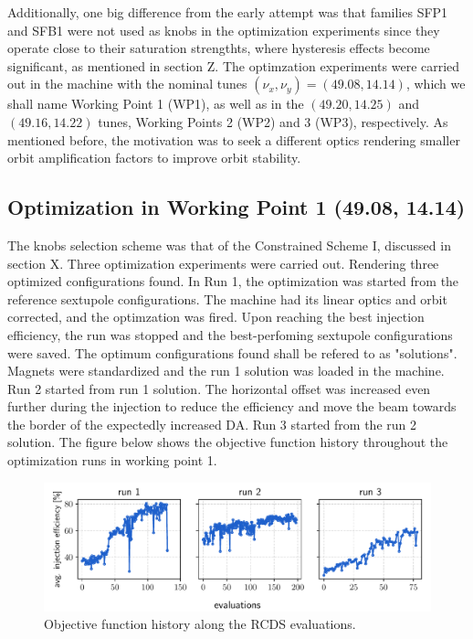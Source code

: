 Additionally, one big difference from the early attempt was that families SFP1 and SFB1 were not used as knobs in the optimization experiments since they operate close to their saturation strengthts, where hysteresis effects become significant, as mentioned in section Z. The optimzation experiments were carried out in the machine with the nominal tunes $(\nu_x,\nu_y)=(49.08, 14.14)$, which we shall name Working Point 1 (WP1), as well as in the $(49.20, 14.25)$ and $(49.16, 14.22)$ tunes, Working Points 2 (WP2) and 3 (WP3), respectively. As mentioned before, the motivation was to seek a different optics rendering smaller orbit amplification factors to improve orbit stability.
\subsection{Optimization in Working Point 1 (49.08, 14.14)}
The knobs selection scheme was that of the Constrained Scheme I, discussed in section X. Three optimization experiments were carried out. Rendering three optimized configurations found. In Run 1, the optimization was started from the reference sextupole configurations. The machine had its linear optics and orbit corrected, and the optimzation was fired. Upon reaching the best injection efficiency, the run was stopped and the best-perfoming sextupole configurations were saved. The optimum configurations found shall be refered to as "solutions". Magnets were standardized and the run 1 solution was loaded in the machine. Run 2  started from run 1 solution. The horizontal offset was increased even further during the injection to reduce the efficiency and move the beam towards the border of the expectedly increased DA. Run 3 started from the run 2 solution. The figure below shows the objective function history throughout the optimization runs in working point 1.
\begin{figure}[tb]
    \centering
    \includegraphics[width=\columnwidth]{Images/wp1_objfunc_hist.pdf}
    \caption{Objective function history along the RCDS evaluations.}
\end{figure}
